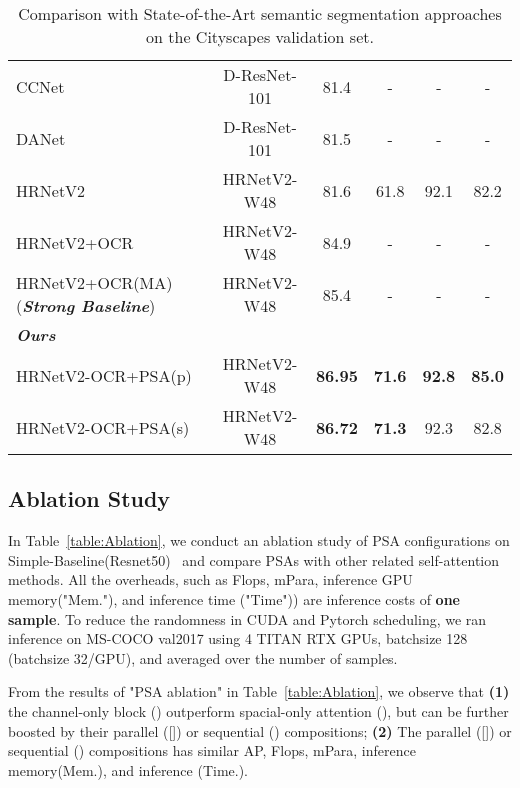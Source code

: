 \documentclass[10pt,twocolumn,letterpaper]{article}
\begin{document}
\begin{table*}[!htb]
\begin{tabular}{l|c|cccc}
CCNet~\cite{Huang2019} & D-ResNet-101 & 81.4 & - & - & -  \\
DANet~\cite{Fu2019} & D-ResNet-101 & 81.5 & - & - & -  \\
HRNetV2~\cite{Wang2020} & HRNetV2-W48 & 81.6 & 61.8 & 92.1 & 82.2 \\
HRNetV2+OCR~\cite{Yuan2020} & HRNetV2-W48 & 84.9 & - & - & -   \\
HRNetV2+OCR(MA)~\cite{Tao2020}  (\textbf{\textsl{Strong Baseline}}) & HRNetV2-W48 & 85.4 & - & - & -   \\
\hline
\textbf{\textit{Ours}}  &  & & & & \\
HRNetV2-OCR+PSA(p) & HRNetV2-W48 & \textbf{86.95}  &\textbf{71.6}  &\textbf{92.8}   &\textbf{85.0} \\
HRNetV2-OCR+PSA(s) & HRNetV2-W48 & \textbf{86.72}  &\textbf{71.3}  &92.3   &82.8 \\
\hline
\end{tabular}
\caption{Comparison with State-of-the-Art semantic segmentation approaches on the Cityscapes validation set. }
\label{table:CityscapesSOTA}
\end{table*}

\subsection{Ablation Study}

In Table~\ref{table:Ablation}, we conduct an ablation study of PSA configurations on Simple-Baseline(Resnet50)~\cite{Xiao18} and compare PSAs with other related self-attention methods. All the overheads, such as Flops, mPara, inference GPU memory("Mem."), and inference time ("Time")) are inference costs of \textbf{one sample}. To reduce the randomness in CUDA and Pytorch scheduling, we ran inference on MS-COCO val2017 using 4 TITAN RTX GPUs, batchsize 128 (batchsize 32/GPU), and averaged over the number of samples. 


From the results of "PSA ablation" in Table~\ref{table:Ablation}, we observe that \textbf{(1)} the channel-only block () outperform spacial-only attention (), but can be further boosted by their parallel ([]) or sequential () compositions; \textbf{(2)} The parallel ([]) or sequential () compositions has similar AP, Flops, mPara, inference memory(Mem.), and inference (Time.).
\end{document}

